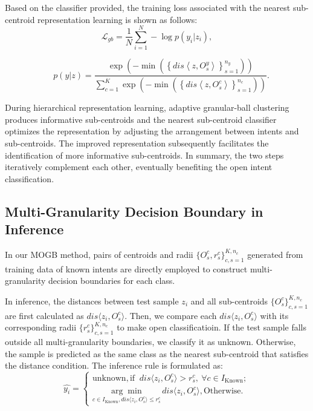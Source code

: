 \documentclass[letterpaper]{article} %
\theoremstyle{definition}
\begin{document}
Based on the classifier provided, the training loss associated with the nearest sub-centroid representation learning is shown as follows:
\begin{equation}\label{loss:cluster}
\mathcal{L}_{gb} = \frac{1}{N} \sum_{i=1}^{N} -\log p(y_{i} | z_{i}),
\end{equation}

\begin{equation}
\quad p(y | z) = \frac{\exp \left(-\min \left( \left \{ dis\left \langle z,O_{s}^{y}   \right \rangle  \right \} _{s=1}^{n_y} \right) \right)}{\sum_{c=1}^{K}  \exp \left( - \min \left( \left \{ dis\left \langle z,O_{s}^{c}   \right \rangle  \right \} _{s=1}^{n_c} \right) \right)}.
\end{equation}

During hierarchical representation learning, adaptive granular-ball clustering produces informative sub-centroids and the nearest sub-centroid classifier optimizes the representation by adjusting the arrangement between intents and sub-centroids.
The improved representation subsequently facilitates the identification of more informative sub-centroids. In summary, the two steps iteratively complement each other, eventually benefiting the open intent classification.

\subsection{Multi-Granularity Decision Boundary in Inference}
In our MOGB method, pairs of centroids and radii $\{O_{s}^{c}, r_{s}^{c}\}_{c,s=1}^{K,n_c}$ generated from training data of known intents are directly employed to construct multi-granularity decision boundaries for each class. 

In inference, the distances between test sample $z_i$ and all sub-centroids $\{O_{s}^{c}\}_{c,s=1}^{K,n_c}$ are first calculated as $dis \langle z_i, O_s^c \rangle$.
Then, we compare each $dis \langle z_i, O_s^c \rangle$ with its corresponding radii $\{r_{s}^{c}\}_{c,s=1}^{K,n_c}$ to make open classificatioin.
If the test sample falls outside all multi-granularity boundaries, we classify it as unknown. Otherwise, the sample is predicted as the same class as the nearest sub-centroid that satisfies the distance condition. The inference rule is formulated as:
\begin{equation}
\hat{y_i} = 
\begin{cases}
\text{unknown}, \text{if }  \ dis  \langle z_i, O_s^c \rangle > r_s^c, \ \forall c \in I_{\text{Known}}; \\
\underset{c \in I_{\text{Known}},dis \langle z_i, O_s^c \rangle \leq r_s^c }{\arg\min} \, dis \langle z_i, O_s^c \rangle, \text{Otherwise}.
\end{cases}
\end{equation}
\end{document}
